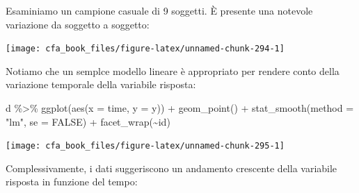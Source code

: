 \documentclass[
  11pt,
]{krantz}
\makeatletter
\newenvironment{Shaded}{\begin{snugshade}}{\end{snugshade}}
\newcommand{\AttributeTok}[1]{\textcolor[rgb]{0.61,0.61,0.61}{#1}}
\newcommand{\ConstantTok}[1]{\textcolor[rgb]{0,0,0}{#1}}
\newcommand{\DecValTok}[1]{\textcolor[rgb]{0.06,0.06,0.06}{#1}}
\newcommand{\FunctionTok}[1]{\textcolor[rgb]{0,0,0}{#1}}
\newcommand{\NormalTok}[1]{#1}
\newcommand{\OtherTok}[1]{\textcolor[rgb]{0.37,0.37,0.37}{#1}}
\newcommand{\SpecialCharTok}[1]{\textcolor[rgb]{0,0,0}{#1}}
\newcommand{\StringTok}[1]{\textcolor[rgb]{0.5,0.5,0.5}{#1}}
\newenvironment{kframe}{%
\medskip{}
\setlength{\fboxsep}{.8em}
 \def\at@end@of@kframe{}%
 \ifinner\ifhmode%
  \def\at@end@of@kframe{\end{minipage}}%
  \begin{minipage}{\columnwidth}%
 \fi\fi%
 \def\FrameCommand##1{\hskip\@totalleftmargin \hskip-\fboxsep
 \colorbox{shadecolor}{##1}\hskip-\fboxsep
     \hskip-\linewidth \hskip-\@totalleftmargin \hskip\columnwidth}%
 \MakeFramed {\advance\hsize-\width
   \@totalleftmargin\z@ \linewidth\hsize
   \@setminipage}}%
 {\par\unskip\endMakeFramed%
 \at@end@of@kframe}
\renewenvironment{Shaded}{\begin{kframe}}{\end{kframe}}
\theoremstyle{definition}
\theoremstyle{definition}
\theoremstyle{definition}
\theoremstyle{definition}
\theoremstyle{remark}
\makeatother
\begin{document}
Esaminiamo un campione casuale di 9 soggetti. È presente una notevole variazione da soggetto a soggetto:

\begin{Shaded}
\end{Shaded}

\begin{center}\texttt{[image: cfa\_book\_files/figure-latex/unnamed-chunk-294-1]} \end{center}

Notiamo che un semplce modello lineare è appropriato per rendere conto della variazione temporale della variabile risposta:

\begin{Shaded}
\begin{Highlighting}[]
\NormalTok{d }\SpecialCharTok{\%\textgreater{}\%}
  \FunctionTok{ggplot}\NormalTok{(}\FunctionTok{aes}\NormalTok{(}\AttributeTok{x =}\NormalTok{ time, }\AttributeTok{y =}\NormalTok{ y)) }\SpecialCharTok{+}
  \FunctionTok{geom\_point}\NormalTok{() }\SpecialCharTok{+}
  \FunctionTok{stat\_smooth}\NormalTok{(}\AttributeTok{method =} \StringTok{"lm"}\NormalTok{, }\AttributeTok{se =} \ConstantTok{FALSE}\NormalTok{) }\SpecialCharTok{+}
  \FunctionTok{facet\_wrap}\NormalTok{(}\SpecialCharTok{\textasciitilde{}}\NormalTok{id)}
\end{Highlighting}
\end{Shaded}

\begin{center}\texttt{[image: cfa\_book\_files/figure-latex/unnamed-chunk-295-1]} \end{center}

Complessivamente, i dati suggeriscono un andamento crescente della variabile risposta in funzione del tempo:
\end{document}
